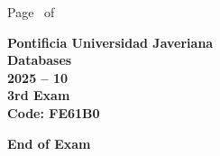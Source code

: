 \documentclass[11pt, addpoints, answers]{exam}\usepackage[utf8]{inputenc}
\begin{document}
\begin{coverpages}
\begin{center}
			\vspace{3mm}
			\leavevmode \hspace{5mm} 
		\end{center}
	\end{coverpages}

	\footer{} {Page \thepage\ of \numpages} {}

	\centering
	\textbf{\Large Pontificia Universidad Javeriana}\\
	\textbf{\Large Databases} \\
	\textbf{\large 2025 -- 10} \\
	\textbf{\large 3rd Exam} \\
	\textbf{Code: FE61B0}


	\begin{questions}
		
		
		
		
		
		
		
		
		
		
		
		
		
		
		
		
		
		
		
		
	\end{questions}

	\vspace{5mm}
	\noindent \textbf{End of Exam}
\end{document}
